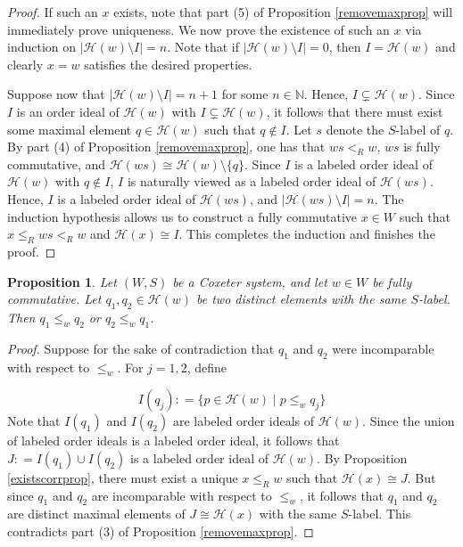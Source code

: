 \documentclass{amsart}
\theoremstyle{plain} %
\newtheorem{prop}[thm]{Proposition}
\theoremstyle{definition}
\def\weakr{\leq_{R}}
\def\sweakr{<_{R}}
\def\N{\mathbb{N}}
\def\H#1{\mathcal{H}(#1)}
\begin{document}
\begin{proof}
    If such an $ x$ exists, note that part (5) of Proposition \ref{removemaxprop} will immediately prove uniqueness. We now prove the existence of such an $ x$ via induction on $ |\H{w} \setminus I| = n$. Note that if $|\H{w} \setminus I| = 0 $, then $ I = \H{w}$ and clearly $ x =w$ satisfies the desired properties.

    Suppose now that $ |\H{w} \setminus I| = n+1$ for some  $n \in \N$. Hence, $ I \subsetneq \H{w}$. Since $I$ is an order ideal of $ \H{w}$ with $I \subsetneq \H{w}$, it follows that there must exist some maximal element $ q\in \H{w}$ such that $ q \notin I$. Let $ s$ denote the $S$-label of $q$. By part (4) of Proposition \ref{removemaxprop}, one has that $ ws \sweakr w$, $ws $ is fully commutative, and $ \H{ws} \cong \H{w} \setminus \{ q \}$. Since $I$ is a labeled order ideal of $ \H{w}$ with $ q\notin I$, $I$ is naturally viewed as a labeled order ideal of $ \H{ws}$. Hence, $I$ is a labeled order ideal of $ \H{ws}$, and $ |\H{ws} \setminus I| =n$. The induction hypothesis allows us to construct a fully commutative $ x \in W$ such that $ x \weakr ws \sweakr w$ and $ \H{x} \cong I$. This completes the induction and finishes the proof.
    
    
\end{proof}

\begin{prop} \label{mustbecompprop}
    Let $ (W,S)$ be a Coxeter system, and let $ w\in W$ be fully commutative. Let $ q_{1}, q_{2} \in \H{w}$ be two distinct elements with the same $S$-label. Then $ q_{1} \leq_{w} q_{2}$ or $ q_{2} \leq_{w} q_{1}$.
\end{prop}

\begin{proof}
    Suppose for the sake of contradiction that $ q_{1}$ and $ q_{2}$ were incomparable with respect to $ \leq_{w}$. For $j =1,2$, define

    $$ I(q_{j}) : = \{  p\in \H{w} \mid p \leq_{w} q_{j} \}$$
    Note that $I(q_{1})$ and $ I(q_{2})$ are labeled order ideals of $ \H{w}$. Since the union of labeled order ideals is a labeled order ideal, it follows that $ J : = I(q_{1}) \cup I(q_{2})$ is a labeled order ideal of $ \H{w}$. By Proposition \ref{existscorrprop}, there must exist a unique $ x \weakr w$ such that $\H{x} \cong J$. But since $ q_{1}$ and $ q_{2}$ are incomparable with respect to $\leq_{w}$, it follows that $q_{1}$ and $q_{2}$ are distinct maximal elements of $ J \cong \H{x}$ with the same $S$-label. This contradicts part (3) of Proposition \ref{removemaxprop}.
\end{proof}
\end{document}

